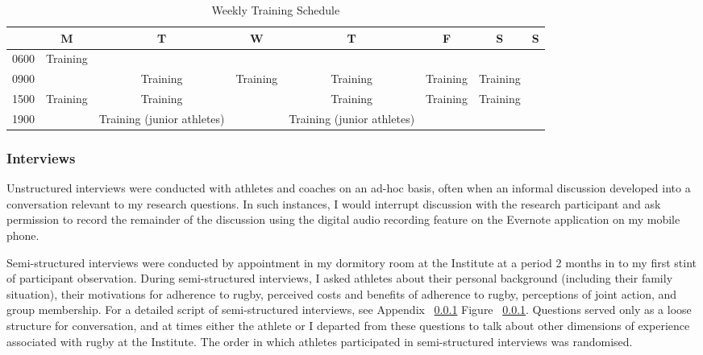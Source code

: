  \begin{landscape}
    \begin{table}[htpb]\caption{Weekly Training Schedule}
      \begin{center}
        \begin{small}
            \begin{tabular}{| c | c | c | c | c | c | c | c |}
              \hline
              & \bf M & \bf T & \bf W & \bf T & \bf F & \bf S & \bf S \\
              \hline
              0600 & Training &  &  & & & & \\
              \hline
              0900 &  & Training & Training & Training & Training & Training &  \\
                \hline
              1500 & Training & Training & & Training & Training & Training &  \\
                \hline
              1900 &  & Training (junior athletes) & & Training (junior athletes) & & & \\
                 \hline
            \end{tabular}
                \label{tab:tournamentData}
          \end{small}
        \end{center}
      \end{table}
  \end{landscape}
  \restoregeometry


  \subsubsection{Interviews}

Unstructured interviews were conducted with athletes and coaches on an ad-hoc basis, often when an informal discussion developed into a conversation relevant to my research questions. In such instances, I would interrupt discussion with the research participant and ask permission to record the remainder of the discussion using the digital audio recording feature on the Evernote application on my mobile phone.

Semi-structured interviews were conducted by appointment in my dormitory room at the Institute at a period 2 months in to my first stint of participant observation.  During semi-structured interviews, I asked athletes about their personal background (including their family situation), their motivations for adherence to rugby, perceived costs and benefits of adherence to rugby, perceptions of joint action, and group membership. For a detailed script of semi-structured interviews, see Appendix ~\ref{} Figure ~\ref{}.  Questions served only as a loose structure for conversation, and at times either the athlete or I departed from these questions to talk about other dimensions of experience associated with rugby at the Institute.  The order in which athletes participated in semi-structured interviews was randomised.

